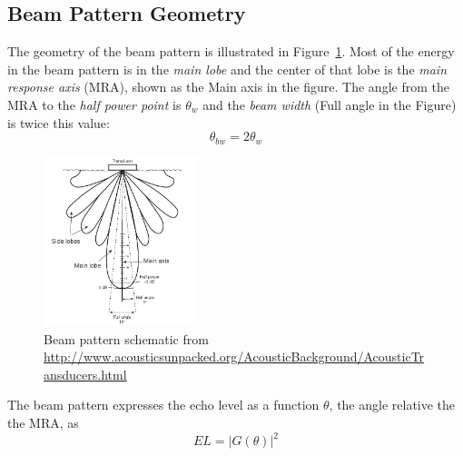 \documentclass[11pt]{article}
\begin{document}
\subsection{Beam Pattern Geometry}
The geometry of the beam pattern is illustrated in Figure~\ref{f:bpattern}.  Most of the energy in the beam pattern is in the \emph{main lobe} and the center of that lobe is the \emph{main response axis} (MRA), shown as the Main axis in the figure. The angle from the MRA to the \emph{half power point} is $\theta_w$ and the \emph{beam width} (Full angle in the Figure) is twice this value:
\[
\theta_{bw}=2 \theta_w
\]

\begin{figure}[hbt!]
  \centering
  \includegraphics[width=0.4\textwidth]{images/beampattern.png}
  \caption{Beam pattern schematic from \url{http://www.acousticsunpacked.org/AcousticBackground/AcousticTransducers.html}}
  \label{f:bpattern}
\end{figure}
The beam pattern expresses the echo level as a function $\theta$, the angle relative the the MRA, as
\[
EL = \left| G(\theta) \right|^2
\]
\end{document}
